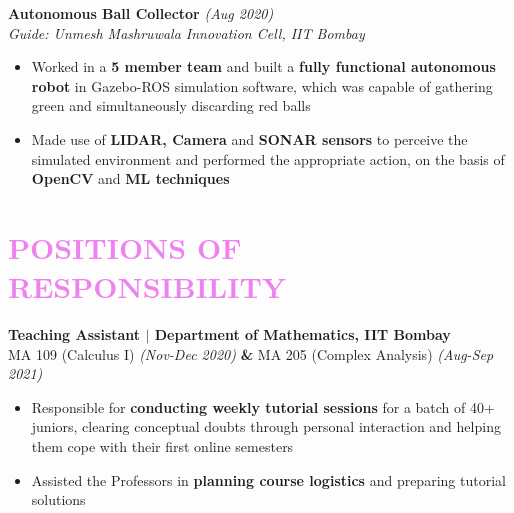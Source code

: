 \documentclass[a4paper,11pt]{article}
\begin{document}
\textbf{Autonomous Ball Collector} \hfill \emph{(Aug 2020)}\\
\vspace{-2pt}
\emph{Guide: Unmesh Mashruwala Innovation Cell, IIT Bombay} 
\vspace{-7.5pt}
\begin{itemize}[noitemsep]
    \item Worked in a \textbf{5 member team} and built a \textbf{fully functional autonomous robot} in Gazebo-ROS simulation software, which was capable of gathering green and simultaneously discarding red balls
    \item Made use of \textbf{LIDAR, Camera} and \textbf{SONAR sensors} to perceive the simulated environment and performed the appropriate action, on the basis of \textbf{OpenCV} and \textbf{ML techniques}
\end{itemize}
\vspace{-7mm}

\section{\textcolor{Violet}{\textbf{\Large{P}\large{OSITIONS} \large{OF} \Large{R}\large{ESPONSIBILITY}}}}
\vspace{-5pt}

\textbf{Teaching Assistant $\mid$ Department of Mathematics, IIT Bombay} \\
MA 109 (Calculus I) \emph{(Nov-Dec 2020)} \textbf{\&} MA 205 (Complex Analysis) \emph{(Aug-Sep 2021)}
\vspace{-7pt} 
\begin{itemize}[noitemsep]
    \item Responsible for \textbf{conducting weekly tutorial sessions} for a batch of 40+ juniors, clearing conceptual doubts through personal interaction and helping them cope with their first online semesters 
    \item Assisted the Professors in \textbf{planning course logistics} and preparing tutorial solutions 
\end{itemize}
\vspace{-7mm}
\end{document}
